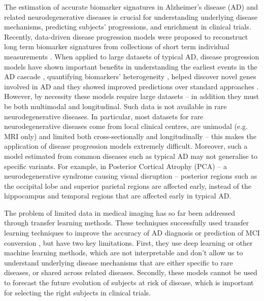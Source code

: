 \documentclass{llncs}
\begin{document}
The estimation of accurate biomarker signatures in Alzheimer's disease (AD) and related neurodegenerative diseases is crucial for understanding underlying disease mechanisms, predicting subjects' progressions, and enrichment in clinical trials. Recently, data-driven disease progression models were proposed to reconstruct long term biomarker signatures from collections of short term individual measurements \cite{lorenzi2017disease,oxtoby2018}. When applied to large datasets of typical AD, disease progression models have shown important benefits in understanding the earliest events in the AD cascade \cite{iturria2016early}, quantifying biomarkers' heterogeneity \cite{young2018uncovering}, helped discover novel genes involved in AD \cite{scelsi2018genetic} and they showed improved predictions over standard approaches \cite{oxtoby2018}. However, by necessity these models require large datasets -- in addition they must be both multimodal and longitudinal. Such data is not available in rare neurodegenerative diseases. In particular, most datasets for rare neurodegenerative diseases come from local clinical centres, are unimodal (e.g. MRI only) and limited both cross-sectionally and longitudinally -- this makes the application of disease progression models extremely difficult.  Moreover, such a model estimated from common diseases such as typical AD may not generalise to specific variants. For example, in Posterior Cortical Atrophy (PCA) -- a neurodegenerative syndrome causing visual disruption -- posterior regions such as the occipital lobe and superior parietal regions are affected early, instead of the hippocampus and temporal regions that are affected early in typical AD. 

The problem of limited data in medical imaging has so far been addressed through transfer learning methods. These techniques successfully used transfer learning techniques to improve the accuracy of AD diagnosis \cite{hon2017towards} or prediction of MCI conversion \cite{cheng2015domain}, but have two key limitations. First, they use deep learning or other machine learning methods, which are not interpretable and don't allow us to understand underlying disease mechanisms that are either specific to rare diseases, or shared across related diseases. Secondly, these models cannot be used to forecast the future evolution of subjects at risk of disease, which is important for selecting the right subjects in clinical trials. 
\end{document}
